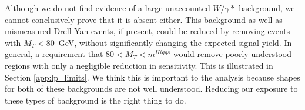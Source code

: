 Although we do not find evidence of a large unaccounted $W/\gamma*$ background,
we cannot conclusively prove that it is absent either.
This background as well as mismeasured Drell-Yan events, 
if present, could be reduced by removing events with $M_T < 80$~GeV,
without significantly changing the expected signal yield.
In general, a requirement that $80 < M_T < m^{Higgs}$ would remove poorly
understood regions with only a negligible reduction in sensitivity.
This is illustrated in Section \ref{app:lp_limits}.
We think this is important to the analysis because shapes for both of
these backgrounds are not well understood. Reducing our exposure to these types of 
background is the right thing to do.

